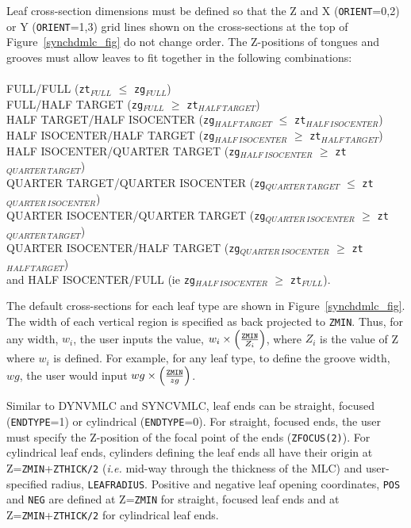 \documentclass[12pt,twoside]{article}
\begin{document}
Leaf cross-section dimensions must be defined so that the Z and X ({\tt ORIENT}=0,2) or Y ({\tt ORIENT}=1,3) grid lines
shown on the cross-sections at the top of Figure~\ref{synchdmlc_fig} do not change order.
The Z-positions of tongues and grooves must allow leaves to fit
together in the following
combinations:\\~~\\
FULL/FULL ({\tt zt}$_{FULL}$ $\leq$ {\tt zg}$_{FULL}$)\\
FULL/HALF TARGET ({\tt zg}$_{FULL}$ $\geq$ {\tt zt}$_{HALF~TARGET}$)\\
HALF TARGET/HALF ISOCENTER ({\tt zg}$_{HALF~TARGET}$ $\leq$ {\tt zt}$_{HALF~ISOCENTER}$)\\
HALF ISOCENTER/HALF TARGET ({\tt zg}$_{HALF~ISOCENTER}$ $\geq$ {\tt zt}$_{HALF~TARGET}$)\\
HALF ISOCENTER/QUARTER TARGET ({\tt zg}$_{HALF~ISOCENTER}$ $\geq$ {\tt zt}$_{QUARTER~TARGET}$)\\
QUARTER TARGET/QUARTER ISOCENTER ({\tt zg}$_{QUARTER~TARGET}$ $\leq$ {\tt zt}$_{QUARTER~ISOCENTER}$)\\
QUARTER ISOCENTER/QUARTER TARGET ({\tt zg}$_{QUARTER~ISOCENTER}$ $\geq$ {\tt zt}$_{QUARTER~TARGET}$)\\
QUARTER ISOCENTER/HALF TARGET ({\tt zg}$_{QUARTER~ISOCENTER}$ $\geq$ {\tt zt}$_{HALF~TARGET}$)\\
and HALF ISOCENTER/FULL (ie {\tt zg}$_{HALF~ISOCENTER}$ $\geq$ {\tt zt}$_{FULL}$).

The default cross-sections for each leaf type are shown in Figure~\ref{synchdmlc_fig}.  The width of
each vertical region is specified as back projected to {\tt ZMIN}.  Thus, for any width, $w_i$,
the user inputs the value, $w_i\times\left(\frac{{\tt ZMIN}}{Z_i}\right)$, where $Z_i$ is the value of Z
where $w_i$ is defined.  For example, for any leaf type, to define the groove width, $wg$,
the user would input $wg\times\left(\frac{{\tt ZMIN}}{zg}\right)$.

Similar to DYNVMLC and SYNCVMLC, leaf ends can be straight, focused ({\tt ENDTYPE}=1) or cylindrical
({\tt ENDTYPE}=0).  For straight, focused ends, the user must specify the Z-position of the
focal point of the ends ({\tt ZFOCUS(2)}).  For cylindrical leaf ends, cylinders defining the leaf
ends all have their origin at Z={\tt ZMIN}+{\tt ZTHICK/2} ({\it i.e.} mid-way through the thickness
of the MLC) and user-specified radius, {\tt LEAFRADIUS}.  Positive and negative leaf opening coordinates, {\tt POS} and {\tt NEG}
are defined at Z={\tt ZMIN} for straight, focused leaf ends and at Z={\tt ZMIN}+{\tt ZTHICK/2} for cylindrical
leaf ends.
\end{document}
